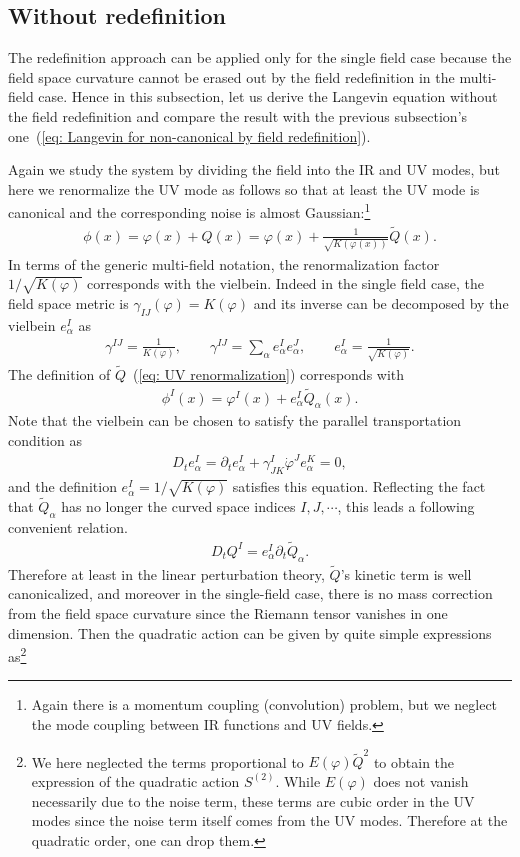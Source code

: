 \documentclass[aps, prd
, preprint
, nofootinbib 
]{revtex4-1}
\newcommand{\bae}[1]{\begin{align} #1 \end{align}}
\begin{document}
\subsection{Without redefinition}

The redefinition approach can be applied only for the single field case because the field space curvature cannot be erased out by
the field redefinition in the multi-field case. 
Hence in this subsection, let us derive the Langevin equation without the field redefinition and compare the result with the previous
subsection's one~(\ref{eq: Langevin for non-canonical by field redefinition}).

Again we study the system by dividing the field into the IR and UV modes, but here we renormalize the UV mode as follows 
so that at least the UV mode is canonical and the corresponding noise is almost Gaussian:\footnote{Again there is a momentum coupling
(convolution) problem, but we neglect the mode coupling between IR functions and UV fields.}
\bae{\label{eq: UV renormalization}
	\phi(x)=\varphi(x)+Q(x)=\varphi(x)+\frac{1}{\sqrt{K(\varphi(x))}}\tilde{Q}(x).
}
In terms of the generic multi-field notation, the renormalization factor $1/\sqrt{K(\varphi)}$ corresponds with the vielbein.
Indeed in the single field case, the field space metric is $\gamma_{IJ}(\varphi)=K(\varphi)$ and
its inverse can be decomposed by the vielbein $e^I_\alpha$ as
\bae{
	\gamma^{IJ}=\frac{1}{K(\varphi)}, \quad\quad \gamma^{IJ}=\sum_\alpha e^I_\alpha e^J_\alpha, \quad\quad e^I_\alpha=\frac{1}{\sqrt{K(\varphi)}}.
}
The definition of $\tilde{Q}$~(\ref{eq: UV renormalization}) corresponds with
\bae{
	\phi^I(x)=\varphi^I(x)+e^I_\alpha\tilde{Q}_\alpha(x).
}
Note that the vielbein can be chosen to satisfy the parallel transportation condition as
\bae{
	D_te^I_\alpha=\partial_te^I_\alpha+\gamma^I_{JK}\dot{\varphi}^Je^K_\alpha=0,
}
and the definition $e^I_\alpha=1/\sqrt{K(\varphi)}$ satisfies this equation.
Reflecting the fact that $\tilde{Q}_\alpha$ has no longer the curved space indices $I,J,\cdots$,
this leads a following convenient relation.
\bae{
	D_tQ^I=e^I_\alpha\partial_t\tilde{Q}_\alpha.
}
Therefore at least in the linear perturbation theory, $\tilde{Q}$'s kinetic term is well canonicalized, and moreover
in the single-field case, there is no mass correction from the field space curvature since the Riemann tensor vanishes in one dimension.
Then the quadratic action can be given by quite simple expressions as\footnote{We here neglected the terms proportional to $E(\varphi)\tilde{Q}^2$
to obtain the expression of the quadratic action $S^{(2)}$. While $E(\varphi)$ does not vanish necessarily due to the noise term,
these terms are cubic order in the UV modes since the noise term itself comes from the UV modes. Therefore at the quadratic order,
one can drop them.}
\end{document}

